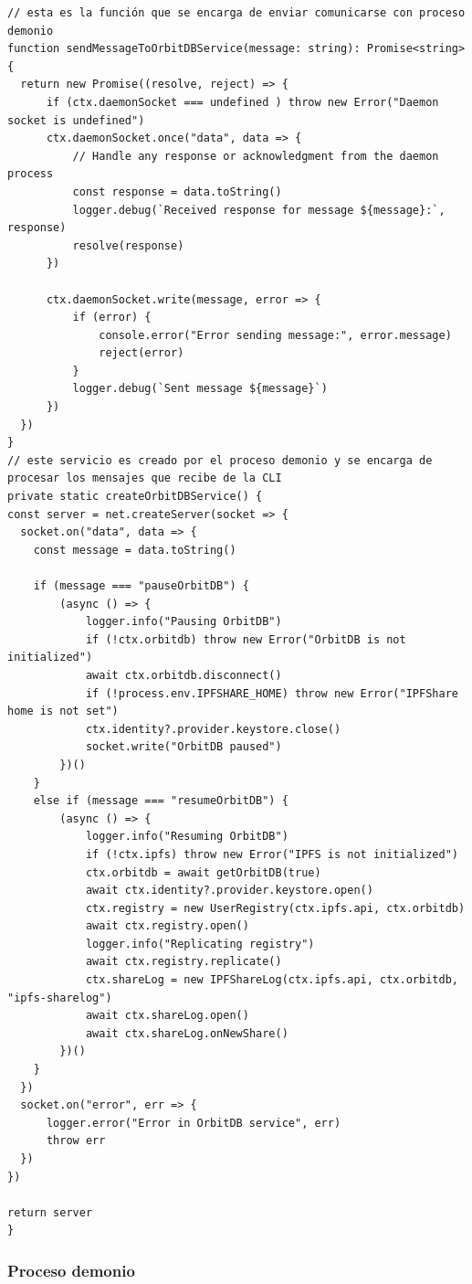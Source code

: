 \begin{verbatim}
// esta es la función que se encarga de enviar comunicarse con proceso demonio
function sendMessageToOrbitDBService(message: string): Promise<string> {
  return new Promise((resolve, reject) => {
      if (ctx.daemonSocket === undefined ) throw new Error("Daemon socket is undefined")
      ctx.daemonSocket.once("data", data => {
          // Handle any response or acknowledgment from the daemon process
          const response = data.toString()
          logger.debug(`Received response for message ${message}:`, response)
          resolve(response)
      })

      ctx.daemonSocket.write(message, error => {
          if (error) {
              console.error("Error sending message:", error.message)
              reject(error)
          }
          logger.debug(`Sent message ${message}`)
      })
  })
}
// este servicio es creado por el proceso demonio y se encarga de procesar los mensajes que recibe de la CLI
private static createOrbitDBService() {
const server = net.createServer(socket => {
  socket.on("data", data => {
    const message = data.toString()

    if (message === "pauseOrbitDB") {
        (async () => {
            logger.info("Pausing OrbitDB")
            if (!ctx.orbitdb) throw new Error("OrbitDB is not initialized")
            await ctx.orbitdb.disconnect()
            if (!process.env.IPFSHARE_HOME) throw new Error("IPFShare home is not set")
            ctx.identity?.provider.keystore.close()
            socket.write("OrbitDB paused")
        })()
    }
    else if (message === "resumeOrbitDB") {
        (async () => {
            logger.info("Resuming OrbitDB")
            if (!ctx.ipfs) throw new Error("IPFS is not initialized")
            ctx.orbitdb = await getOrbitDB(true)
            await ctx.identity?.provider.keystore.open()
            ctx.registry = new UserRegistry(ctx.ipfs.api, ctx.orbitdb)
            await ctx.registry.open()
            logger.info("Replicating registry")
            await ctx.registry.replicate()
            ctx.shareLog = new IPFShareLog(ctx.ipfs.api, ctx.orbitdb, "ipfs-sharelog")
            await ctx.shareLog.open()
            await ctx.shareLog.onNewShare()
        })()
    }
  })
  socket.on("error", err => {
      logger.error("Error in OrbitDB service", err)
      throw err
  })
})

return server
}
\end{verbatim}

\subsubsection{Proceso demonio}


